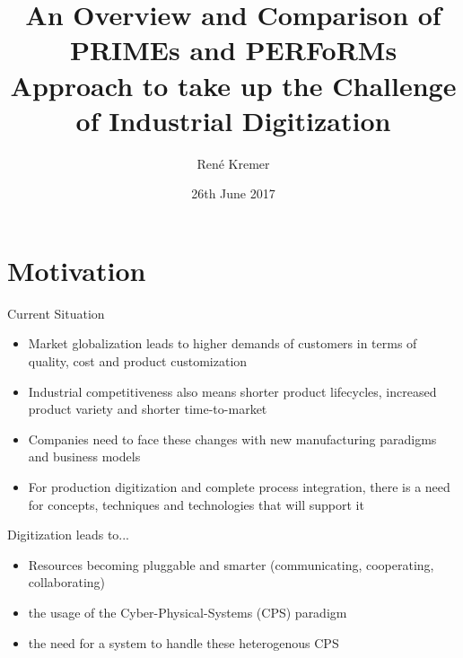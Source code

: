 \documentclass[12pt, xcolor=dvipsnames]{beamer}
\author[René Kremer]{\small René Kremer}
\title[An Overview and Comparison of PRIMEs and PERFoRMs Approach to take up the Challenge of Industrial Digitization]{An Overview and Comparison of PRIMEs and PERFoRMs Approach to take up the Challenge of Industrial Digitization}
\institute{University of Lübeck}
\date{26th June 2017}
\begin{document}
\begin{frame}
	\titlepage
\end{frame}



\section{Motivation}

\begin{frame}{Current Situation}
	\begin{itemize}
		\item Market globalization leads to higher demands of customers in terms of quality, cost and product customization
		\newline
		
		\item Industrial competitiveness also means shorter product lifecycles, increased product variety and shorter time-to-market
		\newline
		
		\item Companies need to face these changes with new manufacturing paradigms and business models
		\newline
		
		\item For production digitization and complete process integration, there is a need for concepts, techniques and technologies that will support it
	\end{itemize}
\end{frame}

\begin{frame}{Digitization leads to...}
	\begin{itemize}
		\item Resources becoming pluggable and smarter (communicating, cooperating, collaborating)
		\newline 
		
		\item the usage of the Cyber-Physical-Systems (CPS) paradigm
		\newline
		
		\item the need for a system to handle these heterogenous CPS
	\end{itemize}
\end{frame}
\end{document}
